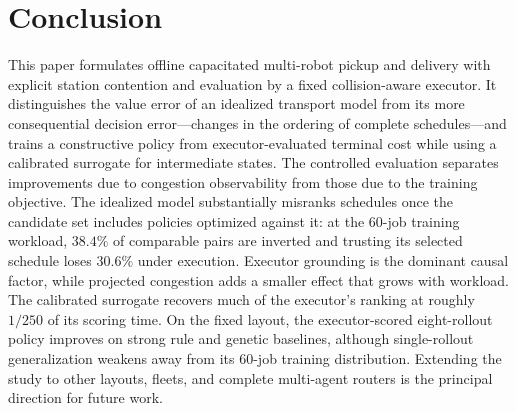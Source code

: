 \documentclass[letterpaper,10pt,conference]{ieeeconf}
\begin{document}




\section{Conclusion}
\label{sec:conclusion}
This paper formulates offline capacitated multi-robot pickup and delivery
with explicit station contention and evaluation by a fixed
collision-aware executor. It distinguishes the value error of an idealized
transport model from its more consequential decision error---changes in the
ordering of complete schedules---and trains a constructive policy from
executor-evaluated terminal cost while using a calibrated surrogate for
intermediate states. The controlled evaluation
separates improvements due to congestion observability from those due to the
training objective. The idealized model substantially misranks schedules once
the candidate set includes policies optimized against it: at the 60-job
training workload, $38.4\%$ of comparable pairs are inverted and trusting its
selected schedule loses $30.6\%$ under execution. Executor grounding is the dominant
causal factor, while projected congestion adds a smaller effect that grows
with workload. The calibrated surrogate recovers much of the executor's
ranking at roughly $1/250$ of its scoring time. On the fixed layout, the
executor-scored eight-rollout policy improves on strong rule and genetic
baselines, although single-rollout generalization weakens away from its
60-job training distribution. Extending the study to other layouts, fleets,
and complete multi-agent routers is the principal direction for future work.



\end{document}
